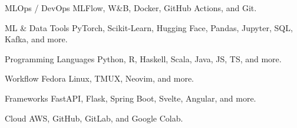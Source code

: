 

\begin{cvskills}

\cvskill
  {MLOps / DevOps} {MLFlow, W\&B, Docker, GitHub Actions, and Git.}

\cvskill
  {ML \& Data Tools}
  {PyTorch, Scikit-Learn, Hugging Face, Pandas, Jupyter, SQL, Kafka, and more.}

\cvskill
  {Programming Languages}
  {Python, R, Haskell, Scala, Java, JS, TS, and more.}

\cvskill
  {Workflow}
  {Fedora Linux, TMUX, Neovim, and more.}

\cvskill
  {Frameworks}
  {FastAPI, Flask, Spring Boot, Svelte, Angular, and more.}

\cvskill
  {Cloud}
  {AWS, GitHub, GitLab, and Google Colab.}

\end{cvskills}
